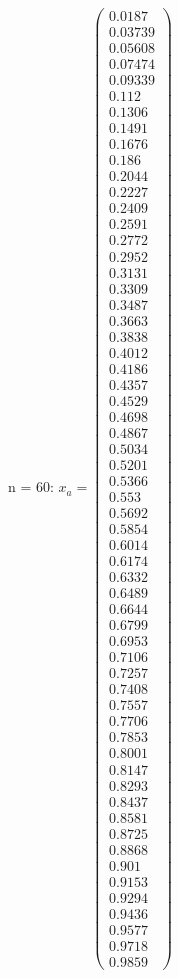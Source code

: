 \documentclass{udpreport}
\begin{document}
\begin{enumerate}
\begin{enumerate}
\begin{itemize}
				
				n = 60:
				$x_{a} = \left(\begin{array}{c} 0.0187\\ 0.03739\\ 0.05608\\ 0.07474\\ 0.09339\\ 0.112\\ 0.1306\\ 0.1491\\ 0.1676\\ 0.186\\ 0.2044\\ 0.2227\\ 0.2409\\ 0.2591\\ 0.2772\\ 0.2952\\ 0.3131\\ 0.3309\\ 0.3487\\ 0.3663\\ 0.3838\\ 0.4012\\ 0.4186\\ 0.4357\\ 0.4529\\ 0.4698\\ 0.4867\\ 0.5034\\ 0.5201\\ 0.5366\\ 0.553\\ 0.5692\\ 0.5854\\ 0.6014\\ 0.6174\\ 0.6332\\ 0.6489\\ 0.6644\\ 0.6799\\ 0.6953\\ 0.7106\\ 0.7257\\ 0.7408\\ 0.7557\\ 0.7706\\ 0.7853\\ 0.8001\\ 0.8147\\ 0.8293\\ 0.8437\\ 0.8581\\ 0.8725\\ 0.8868\\ 0.901\\ 0.9153\\ 0.9294\\ 0.9436\\ 0.9577\\ 0.9718\\ 0.9859 \end{array}\right)$

\end{itemize}
\end{enumerate}
\end{enumerate}
\end{document}
